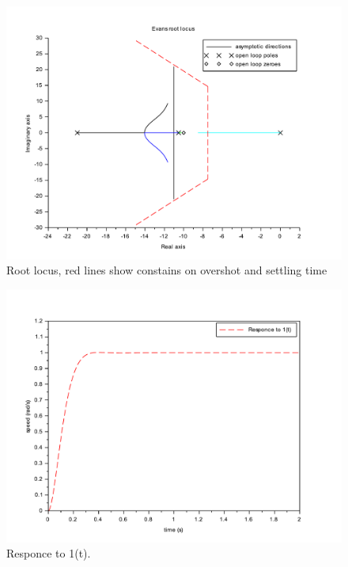 \documentclass[a4paper,12pt,oneside]{article}
\begin{document}
\begin{figure}[t]
	\centering
	\includegraphics[width=\columnwidth]{../controler/root_locus}
	\caption{Root locus, red lines show constains on overshot and settling time}
	\label{fig:root_locus}
\end{figure}

\begin{figure}[t]
	\centering
	\includegraphics[width=\columnwidth]{../controler/response}
	\caption{Responce to 1(t).}
	\label{fig:responce}
\end{figure}
\end{document}
